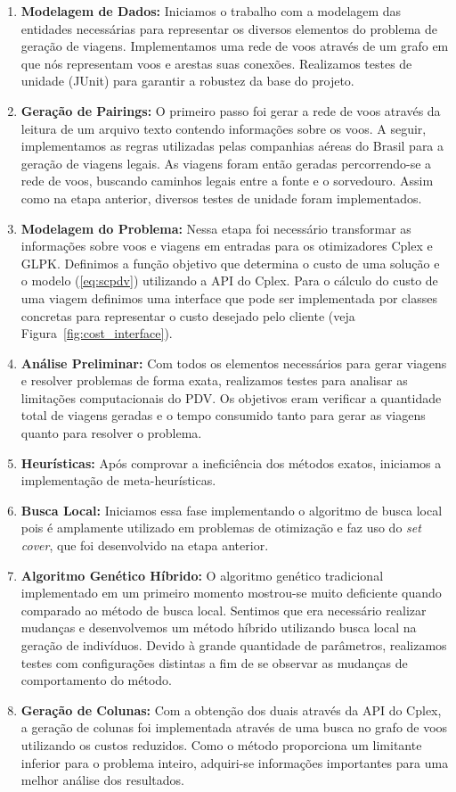 \begin{enumerate}
\item {\bf Modelagem de Dados:}
Iniciamos o trabalho com a modelagem das entidades necessárias para representar os diversos
elementos do problema de geração de viagens. Implementamos uma rede de voos através de um grafo em
que nós representam voos e arestas suas conexões. Realizamos testes de unidade (JUnit) para garantir
a robustez da base do projeto.
\item {\bf Geração de Pairings:}
O primeiro passo foi gerar a rede de voos através da leitura de um arquivo texto contendo
informações sobre os voos. A seguir, implementamos as regras utilizadas pelas companhias aéreas do
Brasil para a geração de viagens legais. As viagens foram então geradas percorrendo-se a rede de
voos, buscando caminhos legais entre a fonte e o sorvedouro. Assim como na etapa anterior, diversos
testes de unidade foram implementados.
\item {\bf Modelagem do Problema:}
Nessa etapa foi necessário transformar as informações sobre voos e viagens em entradas para os
otimizadores Cplex e GLPK. Definimos a função objetivo que determina o custo de uma solução e o
modelo (\ref{eq:scpdv}) utilizando a API do Cplex. Para o cálculo do custo de uma viagem definimos 
uma interface que pode ser implementada por classes concretas para representar o custo desejado 
pelo cliente (veja Figura~\ref{fig:cost_interface}).
\item {\bf Análise Preliminar:}
Com todos os elementos necessários para gerar viagens e resolver problemas de forma exata,
realizamos testes para analisar as limitações computacionais do PDV. Os objetivos eram verificar a
quantidade total de viagens geradas e o tempo consumido tanto para gerar as viagens quanto para
resolver o problema.
\item {\bf Heurísticas:}
Após comprovar a ineficiência dos métodos exatos, iniciamos a implementação de meta-heurísticas.
\item {\bf Busca Local:}
Iniciamos essa fase implementando o algoritmo de busca local pois é amplamente utilizado em
problemas de otimização e faz uso do {\it set cover}, que foi desenvolvido na etapa anterior.
\item {\bf Algoritmo Genético Híbrido:}
O algoritmo genético tradicional implementado em um primeiro momento mostrou-se muito deficiente
quando comparado ao método de busca local. Sentimos que era necessário realizar mudanças e
desenvolvemos um método híbrido utilizando busca local na geração de indivíduos. Devido à grande
quantidade de parâmetros, realizamos testes com configurações distintas a fim de se observar as
mudanças de comportamento do método.
\item {\bf Geração de Colunas:}
Com a obtenção dos duais através da API do Cplex, a geração de colunas foi implementada através de
uma busca no grafo de voos utilizando os custos reduzidos. Como o método proporciona um limitante
inferior para o problema inteiro, adquiri-se informações importantes para uma melhor análise dos
resultados.
\end{enumerate}

